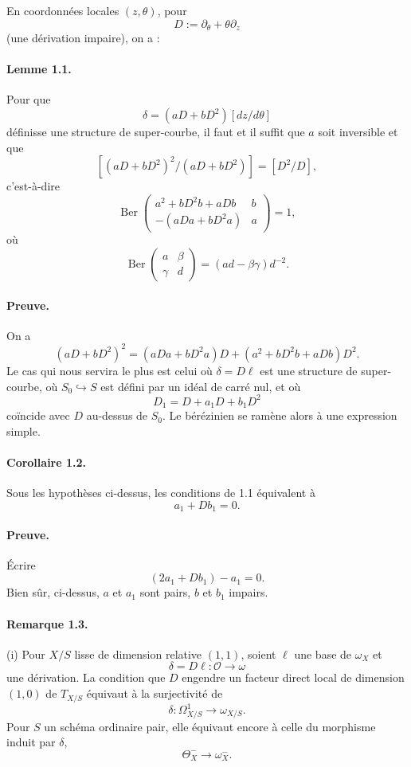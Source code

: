 \documentclass[11pt]{article}
\newcommand{\cO}{\mathcal O}
\newcommand{\Ber}{\operatorname{Ber}}
\begin{document}
En coordonnées locales $(z,\theta)$, pour
\[
  D:=\partial_\theta+\theta\partial_z
\]
(une dérivation impaire), on a :

\paragraph{Lemme 1.1.}
Pour que
\[
  \delta=(aD+bD^2)[dz/d\theta]
\]
définisse une structure de super-courbe, il faut et il suffit que $a$ soit inversible et que
\[
  [(aD+bD^2)^2/(aD+bD^2)]=[D^2/D],
\]
c'est-à-dire
\begin{equation}\tag{1.1.1}
  \Ber\begin{pmatrix}
    a^2+bD^2b+aDb & b\\
    -(aDa+bD^2a) & a
  \end{pmatrix}=1,
\end{equation}
où
\[
  \Ber\begin{pmatrix}a&\beta\\ \gamma&d\end{pmatrix}
   =(ad-\beta\gamma)d^{-2}.
\]

\paragraph{Preuve.}
On a
\[
  (aD+bD^2)^2=(aDa+bD^2a)D+(a^2+bD^2b+aDb)D^2.
\]
Le cas qui nous servira le plus est celui où $\delta=D\ell$ est une structure de super-courbe, où $S_0\hookrightarrow S$ est défini par un idéal de carré nul, et où
\[
  D_1=D+a_1D+b_1D^2
\]
coïncide avec $D$ au-dessus de $S_0$. Le bérézinien se ramène alors à une expression simple.

\paragraph{Corollaire 1.2.}
Sous les hypothèses ci-dessus, les conditions de 1.1 équivalent à
\begin{equation}\tag{1.2.1}
  a_1+Db_1=0.
\end{equation}

\paragraph{Preuve.}
Écrire
\[
  (2a_1+Db_1)-a_1=0.
\]
Bien sûr, ci-dessus, $a$ et $a_1$ sont pairs, $b$ et $b_1$ impairs.

\paragraph{Remarque 1.3.}
(i) Pour $X/S$ lisse de dimension relative $(1,1)$, soient $\ell$ une base de $\omega_X$ et
\[
  \delta=D\ell:\cO\longrightarrow \omega
\]
une dérivation. La condition que $D$ engendre un facteur direct local de dimension $(1,0)$ de $T_{X/S}$ équivaut à la surjectivité de
\[
  \delta:\Omega^1_{X/S}\longrightarrow \omega_{X/S}.
\]
Pour $S$ un schéma ordinaire pair, elle équivaut encore à celle du morphisme induit par $\delta$,
\[
  \Theta_X^-\longrightarrow \omega_X^-.
\]
\end{document}

